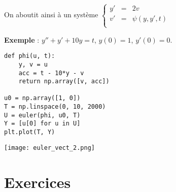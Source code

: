 On aboutit ainsi à un système $\left\{\begin{matrix}y'&=&2v\\ v' &=& \psi(y, y', t)\\ \end{matrix}\right.$

\begin{minipage}{0.50\linewidth}
{\bf Exemple} : $y''+y'+10y = t$, $y(0)=1$, $y'(0) = 0$.
\begin{lstlisting}
def phi(u, t):
    y, v = u
    acc = t - 10*y - v
    return np.array([v, acc])

u0 = np.array([1, 0])
T = np.linspace(0, 10, 2000)
U = euler(phi, u0, T)
Y = [u[0] for u in U]
plt.plot(T, Y)
\end{lstlisting}
\end{minipage}
\begin{minipage}{0.35\linewidth}
\begin{center}
\texttt{[image: euler\_vect\_2.png]}
\end{center}
\end{minipage} 
\newpage
\section{Exercices}
